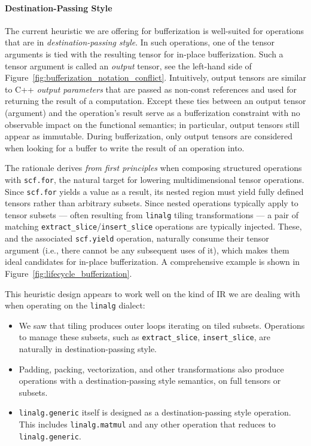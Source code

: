 \paragraph{Destination-Passing Style}
The current heuristic we are offering for bufferization is well-suited for operations that are in \emph{destination-passing style}. 
In such operations, one of the tensor arguments is tied with the resulting tensor for in-place bufferization.
Such a tensor argument is called an \emph{output} tensor, see the left-hand side of Figure~\ref{fig:bufferization_notation_conflict}. 
Intuitively, output tensors are similar to C++ \emph{output parameters} that are passed as non-const references and used for returning the result of a computation. 
Except these ties between an output tensor (argument) and the operation's result serve as a bufferization constraint with no observable impact on the functional semantics; in particular, output tensors still appear as immutable.
During bufferization, only output tensors are considered when looking for a buffer to write the result of an operation into.

The rationale derives \emph{from first principles} when composing structured operations with \lstinline{scf.for}, the natural target for lowering multidimensional tensor operations.
Since \lstinline{scf.for} yields a value as a result, its nested region must yield fully defined tensors rather than arbitrary subsets.
Since nested operations typically apply to tensor subsets --- often resulting from \lstinline{linalg} tiling transformations --- a pair of matching \lstinline{extract_slice}/\lstinline{insert_slice} operations are typically injected.
These, and the associated \lstinline{scf.yield} operation, naturally consume their tensor argument (i.e., there cannot be any subsequent uses of it), which makes them ideal candidates for in-place bufferization. 
A comprehensive example is shown in Figure~\ref{fig:lifecycle_bufferization}.

This heuristic design appears to work well on the kind of IR we are dealing with when operating on the \texttt{linalg} dialect:
\begin{itemize}
    \item We saw that tiling produces outer loops iterating on tiled subsets. Operations to manage these subsets, such as \lstinline{extract_slice}, \lstinline{insert_slice}, are naturally in destination-passing style.
    \item Padding, packing, vectorization, and other transformations also produce operations with a destination-passing style semantics, on full tensors or subsets.
    \item \lstinline{linalg.generic} itself is designed as a destination-passing style operation. This includes \lstinline{linalg.matmul} and any other operation that reduces to \lstinline{linalg.generic}.
\end{itemize}

